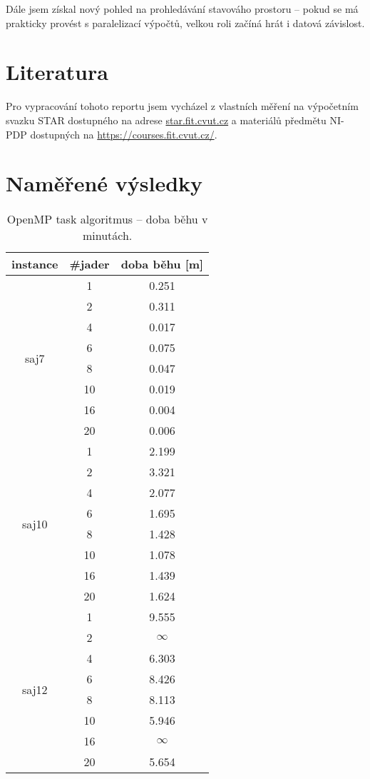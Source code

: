 \documentclass{article}
\begin{document}
    Dále jsem získal nový pohled na prohledávání stavováho prostoru -- pokud se má prakticky provést s paralelizací
    výpočtů, velkou roli začíná hrát i datová závislost.

\section{Literatura}
    Pro vypracování tohoto reportu jsem vycházel z vlastních měření na výpočetním svazku STAR dostupného na adrese \url{star.fit.cvut.cz} a
    materiálů předmětu NI-PDP dostupných na \url{https://courses.fit.cvut.cz/}.


    \appendix

    \label{app:vysledky}
    \section{Naměřené výsledky}

    \begin{table}[h]
        \centering
        \begin{tabular}{|c|c|c|}
            \hline
            \multicolumn{1}{|l|}{\textbf{instance}} & \multicolumn{1}{l|}{\textbf{\#jader}} & \textbf{doba běhu} {[}m{]} \\ \hline
            \multirow{8}{*}{saj7}  & 1  & 0.251 \\
            & 2  & 0.311 \\
            & 4  & 0.017 \\
            & 6  & 0.075 \\
            & 8  & 0.047 \\
            & 10 & 0.019 \\
            & 16 & 0.004 \\
            & 20 & 0.006 \\ \hline
            \multirow{8}{*}{saj10} & 1  & 2.199 \\
            & 2  & 3.321 \\
            & 4  & 2.077 \\
            & 6  & 1.695 \\
            & 8  & 1.428 \\
            & 10 & 1.078 \\
            & 16 & 1.439 \\
            & 20 & 1.624 \\ \hline
            \multirow{8}{*}{saj12} & 1  & 9.555 \\
            & 2  & $\infty$   \\
            & 4  & 6.303 \\
            & 6  & 8.426 \\
            & 8  & 8.113 \\
            & 10 & 5.946 \\
            & 16 & $\infty$   \\
            & 20 & 5.654 \\ \hline
        \end{tabular}
        \caption{OpenMP task algoritmus -- doba běhu v minutách.}
        \label{tab:openmp-task}
    \end{table}
\end{document}
